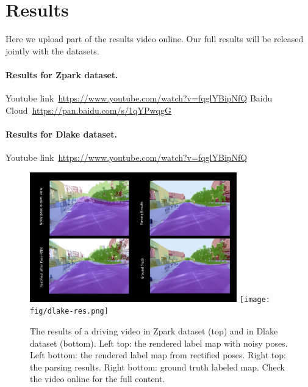 \documentclass[10pt,twocolumn,letterpaper]{article}
\begin{document}
\section{Results} 
Here we upload part of the results video online. Our full results will be released jointly with the datasets.

\paragraph{Results for Zpark dataset.}

Youtube link~\url{https://www.youtube.com/watch?v=fqglYBipNfQ}
Baidu Cloud~\url{https://pan.baidu.com/s/1qYPwqgG}

\paragraph{Results for Dlake dataset.} 
Youtube link~\url{https://www.youtube.com/watch?v=fqglYBipNfQ}

\begin{figure}[!hbpt]
\center
\includegraphics[width=0.8\textwidth]{fig/results_video.pdf}
\texttt{[image: fig/dlake-res.png]}
\caption{The results of a driving video in Zpark dataset (top) and in Dlake dataset (bottom). Left top: the rendered label map with noisy poses. Left bottom: the rendered label map from rectified poses. Right top: the parsing results. Right bottom: ground truth labeled map. Check the video online for the full content.}
\label{fig:framework}
\end{figure}

% 
% 
\end{document}
